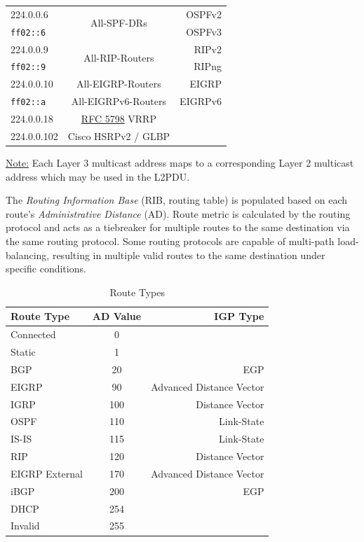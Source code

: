 \documentclass[12pt]{article}
\newif\ifcolor											%
\newcommand{\note}[1]{\ifcolor \colorbox{#1}{Note:}\else \underline{Note:}\fi}
\newcommand{\RFC}[1]{\href{https://datatracker.ietf.org/doc/html/rfc#1}{RFC #1}}
\newcommand{\mr}[2]{\multirow{#1}{*}{#2}}
\begin{document}
\begin{table}[H]
\begin{minipage}{.6\linewidth}
\begin{tabular}{| l | c | r |}
	224.0.0.6		& \mr{2}{All-SPF-DRs}		& OSPFv2\\
	\texttt{ff02::6}	&					& OSPFv3\\\hline
	224.0.0.9		& \mr{2}{All-RIP-Routers}	& RIPv2\\
	\texttt{ff02::9}	&					& RIPng\\\hline
	224.0.0.10		& All-EIGRP-Routers		& EIGRP\\
	\texttt{ff02::a}	& All-EIGRPv6-Routers		& EIGRPv6\\\hline
	224.0.0.18		& \RFC{5798} VRRP		&\\\hline
	224.0.0.102		& Cisco HSRPv2 / GLBP		&\\\hline
	\end{tabular}\end{minipage}\end{table}
	\note{Goldenrod} Each Layer 3 multicast address maps to a corresponding Layer 2 multicast address which may be used in the L2PDU.

	The \textit{Routing Information Base} (RIB, routing table) is populated based on each route's \textit{Administrative Distance} (AD). Route metric is calculated by the routing protocol and acts as a tiebreaker for multiple routes to the same destination via the same routing protocol. Some routing protocols are capable of multi-path load-balancing, resulting in multiple valid routes to the same destination under specific conditions.

	\begin{table}[H]
	\centering
	\caption{Route Types \label{tab:ROUTE TYPES}}
	\begin{tabular}{@{} l c r @{}}\hline
	\textbf{Route Type}	& \textbf{AD Value}	& \textbf{IGP Type}\\\hline
	Connected 			& 0				&\\
	Static				& 1				&\\
	BGP				& 20				& EGP\\
	EIGRP				& 90				& Advanced Distance Vector\\
	IGRP				& 100				& Distance Vector\\
	OSPF				& 110				& Link-State\\
	IS-IS				& 115				& Link-State\\
	RIP				& 120				& Distance Vector\\
	EIGRP External		& 170				& Advanced Distance Vector\\
	iBGP				& 200				& EGP\\
	DHCP			& 254				&\\
	Invalid			& 255				&\\\hline
	\end{tabular}\end{table}
\end{document}
